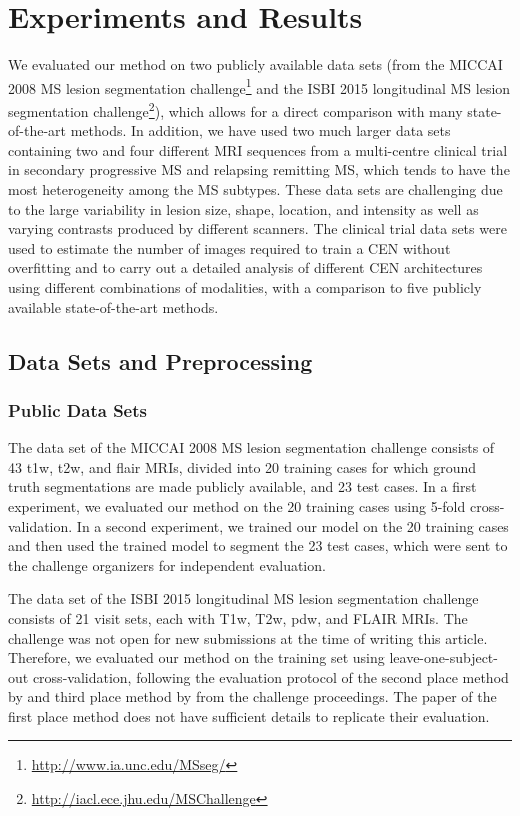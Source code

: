 
\section[Experiments and results]{Experiments and Results}

We evaluated our method on two publicly available data sets (from the MICCAI
2008 MS lesion segmentation
challenge\footnote{\url{http://www.ia.unc.edu/MSseg/}} and the ISBI 2015
longitudinal MS lesion segmentation
challenge\footnote{\url{http://iacl.ece.jhu.edu/MSChallenge}}), which allows for
a direct comparison with many state-of-the-art methods. In addition, we have
used two much larger data sets containing two and four different MRI sequences
from a multi-centre clinical trial in secondary progressive MS and relapsing
remitting MS, which tends to have the most heterogeneity among the MS subtypes.
These data sets are challenging due to the large variability in lesion size,
shape, location, and intensity as well as varying contrasts produced by
different scanners. The clinical trial data sets were used to estimate the
number of images required to train a CEN without overfitting and to carry out a
detailed analysis of different CEN architectures using different combinations of
modalities, with a comparison to five publicly available state-of-the-art
methods.

\subsection[Data sets and preprocessing]{Data Sets and Preprocessing}

\subsubsection{Public Data Sets}
The data set of the MICCAI 2008 MS lesion segmentation challenge
\citep{styner20083d} consists of 43 \gls{t1w}, \gls{t2w}, and
\gls{flair} MRIs, divided into 20 training cases for which ground truth
segmentations are made publicly available, and 23 test cases. In a first
experiment, we evaluated our method on the 20 training cases using 5-fold
cross-validation. In a second experiment, we trained our model on the 20
training cases and then used the trained model to segment the 23 test cases,
which were sent to the challenge organizers for independent evaluation.

The data set of the ISBI 2015 longitudinal MS lesion segmentation challenge
consists of 21 visit sets, each with T1w, T2w, \gls{pdw}, and FLAIR MRIs. The
challenge was not open for new submissions at the time of writing this article.
Therefore, we evaluated our method on the training set using
leave-one-subject-out cross-validation, following the evaluation protocol of the
second place method by \citet{jesson2015} and third place method by
\citet{maier2015} from the challenge proceedings. The paper of the first place
method does not have sufficient details to replicate their evaluation.

